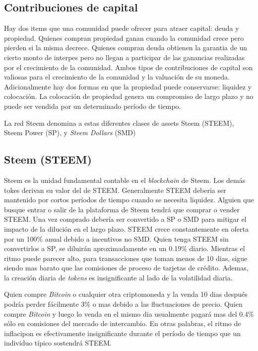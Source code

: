\documentclass[a4paper,titlepage,final]{article}
\begin{document}
\subsection{Contribuciones de capital}

Hay dos items que una comunidad puede ofrecer para atraer capital: deuda y propiedad. Quienes compran propiedad ganan cuando la comunidad crece pero pierden si la misma decrece. Quienes compran deuda obtienen la garantia de un cierto monto de interpes pero no llegan a participar de las ganancias realizadas por el crecimiento de la comunidad. Ambos tipos de contribuciones de capital son valiosas para el crecimiento de la comunidad y la valuación de su moneda. Adicionalmente hay dos formas en que la propiedad puede conservarse: liquidez y colocación. La colocación de propiedad genera un compromiso de largo plazo y no puede ser vendida por un determinado período de tiempo.

La red Steem denomina a estas diferentes clases de assets Steem (STEEM), Steem Power (SP), y \textit{Steem Dollars} (SMD)

\subsection{Steem (STEEM)}

Steem es la unidad fundamental contable en el \textit{blockchain} de Steem. Los demás tokes derivan su valor del de STEEM. Generalmente STEEM deberia ser mantenido por cortos períodos de tiempo cuando se necesita liquidez. Alguien que busque entrar o salir de la plataforma de Steem tendrá que comprar o vender STEEM. Una vez comprado debería ser convertido a SP o SMD para mitigar el impacto de la dilución en el largo plazo. STEEM crece constantemente en oferta por un 100\% anual debido a incentivos no SMD. Quien tenga STEEM sin convertirlos a SP, se diluirán aproximadamente en un 0.19\% diario. Mientras el ritmo puede parecer alto, para transacciones que toman menos de 10 dias, sigue siendo mas barato que las comisiones de proceso de tarjetas de crédito. Ademas, la creación diaria de \textit{tokens} es insignificante al lado de la volatilidad diaria.

Quien compre \textit{Bitcoin} o cualquier otra criptomoneda y la venda 10 dias después podría perder fácilmente 3\% o mas debido a las fluctuaciones de precio. Quien compre \textit{Bitcoin} y luego lo venda en el mismo dia usualmente pagará mas del 0.4\% sólo en comisiones del mercado de intercambio. En otras palabras, el ritmo de inflacipon es efectivamente insignificante durante el período de tiempo que un individuo típico sostendrá STEEM.
\end{document}
